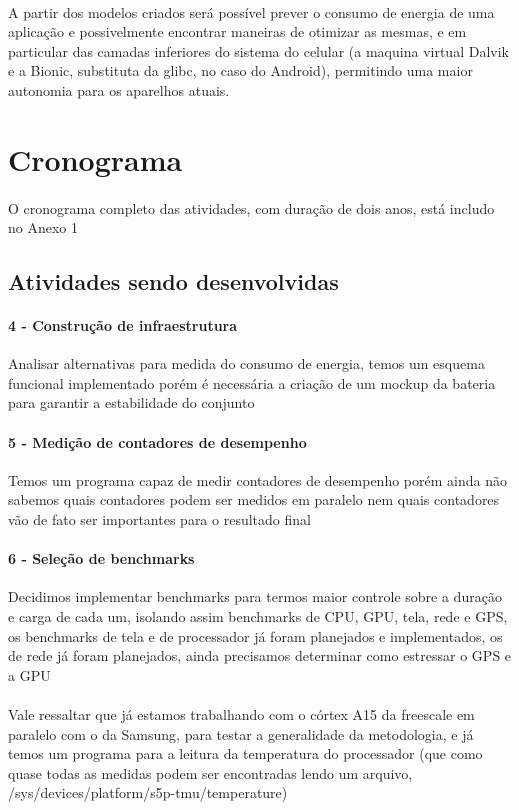 \documentclass[11pt,a4paper,titlepage]{article}
\begin{document}
\paragraph{} A partir dos modelos criados será possível prever o consumo de energia de uma aplicação e possivelmente encontrar maneiras de otimizar as mesmas, e em particular das camadas inferiores do sistema do celular (a maquina virtual Dalvik e a Bionic, substituta da glibc, no caso do Android), permitindo uma maior autonomia para os aparelhos atuais.

\section{Cronograma}
\paragraph{} O cronograma completo das atividades, com duração de dois anos, está includo no Anexo 1
\subsection{Atividades sendo desenvolvidas}
\paragraph{4 - Construção de infraestrutura} Analisar alternativas para medida do 
consumo de energia, temos um esquema funcional implementado porém é necessária a criação de um mockup da bateria para garantir a estabilidade do conjunto 
\paragraph{5 - Medição de contadores de desempenho} Temos um programa capaz de medir contadores de desempenho porém ainda não sabemos quais contadores podem ser medidos em paralelo nem quais contadores vão de fato ser importantes para o resultado final
\paragraph{6 - Seleção de benchmarks} Decidimos implementar benchmarks para termos maior controle sobre a duração e carga de cada um, isolando assim benchmarks de CPU, GPU, tela, rede e GPS, os benchmarks de tela e de processador já foram planejados e implementados, os de rede já foram planejados, ainda precisamos determinar como estressar o GPS e a GPU
\paragraph{} Vale ressaltar que já estamos trabalhando com o córtex A15 da freescale em paralelo com o da Samsung, para testar a generalidade da metodologia, e já temos um programa para a leitura da temperatura do processador (que como quase todas as medidas podem ser encontradas lendo um arquivo, /sys/devices/platform/s5p-tmu/temperature)
\end{document}
